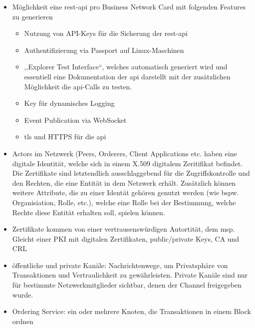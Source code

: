         
        
        
        \begin{itemize}[noitemsep]
            \item Möglichkeit eine \gls{rest}-\gls{api} pro Business Network Card mit folgenden Features zu generieren
                \begin{itemize}[noitemsep]
                    \item Nutzung von API-Keys für die Sicherung der \gls{rest}-\gls{api}
                    \item Authentifizierung via Passport auf Linux-Maschinen
                    \item ,,Explorer Test Interface``, welches automatisch generiert wird und essentiell eine Dokumentation der \gls{api} darstellt mit der zusätzlichen Möglichkeit die \gls{api}-Calls zu testen.
                    \item Key für dynamisches Logging
                    \item Event Publication via WebSocket
                    \item \gls{tls} und HTTPS für die \gls{api}
                \end{itemize}
            \item Actors im Netzwerk (Peers, Orderers, Client Applications etc. haben eine digitale Identität, welche sich in einem X.509 digitalem Zeritifikat befindet.
                Die Zertifikate sind letztendlich ausschlaggebend für die Zugriffskontrolle und den Rechten, die eine Entität in dem Netzwerk erhält. 
                Zusätzlich können weitere Attribute, die zu einer Identät gehören genutzt werden (wie bspw. Organisiation, Rolle, etc.), welche eine Rolle bei der Bestimmung, welche Rechte diese Entität erhalten soll, spielen können.
            \item Zertifikate kommen von einer vertrausenswürdigen Autortität, dem \gls{msp}. 
                Gleicht einer PKI mit digitalen Zertifikaten, public/\-private Keys, CA und CRL
            \item öffentliche und private Kanäle: Nachrichtenwege, um Privatsphäre von Transaktionen und Vertraulichkeit zu gewährleisten.
                Private Kanäle sind nur für bestimmte Netzwerkmitglieder sichtbar, denen der Channel freigegeben wurde.
            \item Ordering Service: ein oder mehrere Knoten, die Transaktionen in einem Block ordnen
        \end{itemize}
        
